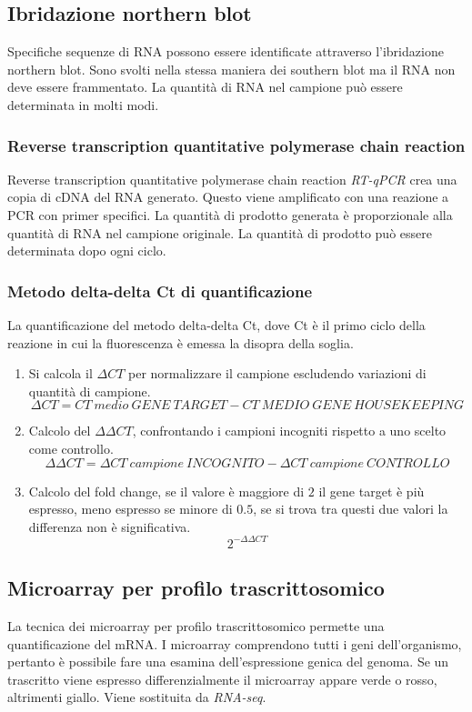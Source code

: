 	\subsection{Ibridazione northern blot}
	Specifiche sequenze di RNA possono essere identificate attraverso l'ibridazione northern blot.
	Sono svolti nella stessa maniera dei southern blot ma il RNA non deve essere frammentato.
	La quantit\`a di RNA nel campione pu\`o essere determinata in molti modi.

		\subsubsection{Reverse transcription quantitative polymerase chain reaction}
		Reverse transcription quantitative polymerase chain reaction \emph{RT-qPCR} crea una copia di cDNA del RNA generato.
		Questo viene amplificato con una reazione a PCR con primer specifici.
		La quantit\`a di prodotto generata \`e proporzionale alla quantit\`a di RNA nel campione originale.
		La quantit\`a di prodotto pu\`o essere determinata dopo ogni ciclo.

		\subsubsection{Metodo delta-delta Ct di quantificazione}
		La quantificazione del metodo delta-delta Ct, dove Ct \`e il primo ciclo della reazione in cui la fluorescenza \`e emessa la disopra della soglia.
		\begin{multicols}{2}
			\begin{enumerate}
				\item Si calcola il \emph{$\Delta CT$} per normalizzare il campione escludendo variazioni di quantit\`a di campione.
					\[\Delta CT = CT\ medio\ GENE\ TARGET - CT\ MEDIO\ GENE\ HOUSEKEEPING\]
				\item Calcolo del $\Delta\Delta CT$, confrontando i campioni incogniti rispetto a uno scelto come controllo.
					\[\Delta\Delta CT = \Delta CT\ campione\ INCOGNITO - \Delta CT\ campione\ CONTROLLO\]
				\item Calcolo del fold change, se il valore \`e maggiore di $2$ il gene target \`e pi\`u espresso, meno espresso se minore di $0.5$, se si trova tra questi due valori la differenza non \`e significativa.
					\[2^{-\Delta\Delta CT}\]
			\end{enumerate}
		\end{multicols}

	\subsection{Microarray per profilo trascrittosomico}
	La tecnica dei microarray per profilo trascrittosomico permette una quantificazione del mRNA.
	I microarray comprendono tutti i geni dell'organismo, pertanto \`e possibile fare una esamina dell'espressione genica del genoma.
	Se un trascritto viene espresso differenzialmente il microarray appare verde o rosso, altrimenti giallo.
	Viene sostituita da \emph{RNA-seq}.


